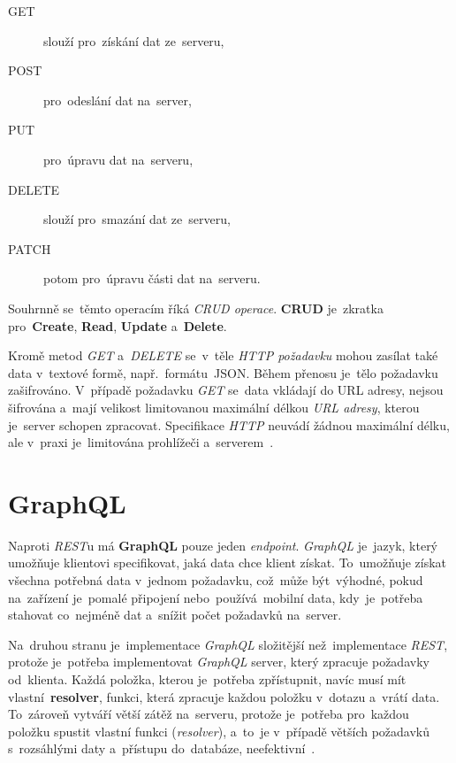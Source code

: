 \documentclass[11pt,a4paper]{report}
\let\oldacrshort\acrshort
\renewcommand{\acrshort}[1]{\emph{\normalsize\color[rgb]{0,0,0}\noindent\oldacrshort{#1}}}
\begin{document}
            \begin{description}
                \item[GET] slouží pro~získání dat ze~serveru,
                \item[POST] pro~odeslání dat na~server,
                \item[PUT] pro~úpravu dat na~serveru,
                \item[DELETE] slouží pro~smazání dat ze~serveru,
                \item[PATCH] potom pro~úpravu části dat na~serveru.
            \end{description}

            Souhrnně se~těmto operacím říká \emph{CRUD operace}. \textbf{CRUD} je~zkratka pro~\textbf{Create}, \textbf{Read}, \textbf{Update} a~\textbf{Delete}.

            Kromě metod \emph{GET} a~\emph{DELETE} se~v~těle \emph{HTTP požadavku} mohou zasílat také data v~textové formě, např.~formátu~JSON. Během přenosu je~tělo požadavku zašifrováno. V~případě požadavku \emph{GET} se~data vkládají do URL adresy, nejsou šifrována a~mají velikost limitovanou maximální délkou \emph{URL adresy}, kterou je~server schopen zpracovat. Specifikace \acrshort{HTTP} neuvádí žádnou maximální délku, ale v~praxi je~limitována prohlížeči a~serverem~\cite[3.2.1]{ietf-httpbis-messaging-03}.

        \section{GraphQL}
            Naproti \acrshort{REST}u má \textbf{GraphQL} pouze jeden \emph{endpoint}. \emph{GraphQL} je~jazyk, který umožňuje klientovi specifikovat, jaká data chce klient získat. To~umožňuje získat všechna potřebná data v~jednom požadavku, což~může být~výhodné, pokud na~zařízení je~pomalé připojení nebo~používá~mobilní data, kdy~je~potřeba stahovat co~nejméně dat a~snížit počet požadavků na~server.

            Na~druhou stranu je~implementace \emph{GraphQL} složitější než~implementace \acrshort{REST}, protože je~potřeba implementovat \emph{GraphQL} server, který zpracuje požadavky od~klienta. Každá položka, kterou je~potřeba zpřístupnit, navíc musí mít vlastní~\textbf{resolver}, funkci, která zpracuje každou položku v~dotazu a~vrátí data. To~zároveň vytváří větší zátěž na~serveru, protože je~potřeba pro~každou položku spustit vlastní funkci (\emph{resolver}), a~to~je v~případě větších požadavků s~rozsáhlými daty a~přístupu do~databáze, neefektivní~\cite{Herrera:restgraphql, Dorman:webmappingajax}.
\end{document}
